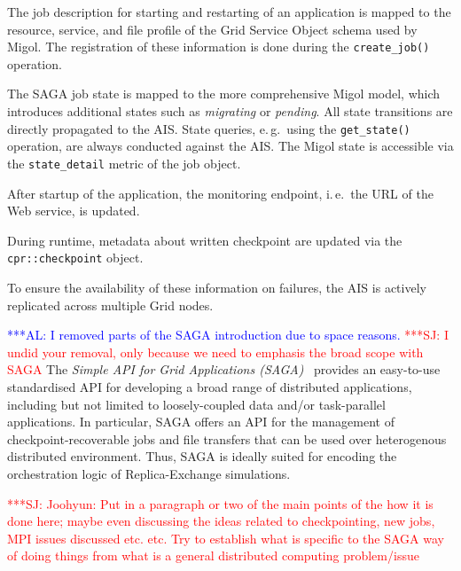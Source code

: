 \documentclass[conference,final]{IEEEtran}
\newcommand{\up}{\vspace*{-1em}}
\newcommand{\alnote}[1]{ {\textcolor{blue} { ***AL: #1 }}}
\newcommand{\jhanote}[1]{ {\textcolor{red} { ***SJ: #1 }}}
\newcommand{\alnote}[1]{}
\newcommand{\jhanote}[1]{}
\begin{document}
\begin{compactitem}
\item The job description for starting and restarting of an
  application is mapped to the resource, service, and file profile of
  the Grid Service Object schema used by Migol. The registration of
  these information is done during the \texttt{create\_job()}
  operation.
\item The SAGA job state is mapped to the more comprehensive Migol
  model, which introduces additional states such as \emph{migrating}
  or \emph{pending}. All state transitions are directly propagated to
  the AIS. State queries, e.\,g.\ using the \texttt{get\_state()}
  operation, are always conducted against the AIS. The Migol state is
  accessible via the \texttt{state\_detail} metric of the job object.
\item After startup of the application, the monitoring endpoint,
  i.\,e.\ the URL of the Web service, is updated.
\item During runtime, metadata about written checkpoint are 
  updated via the \texttt{cpr::checkpoint} object.
\end{compactitem}   
To ensure the availability of these information on failures,
the AIS is actively replicated across multiple Grid nodes.


\up
{}

\up \alnote{I removed parts of the SAGA introduction due to space
  reasons.}  \jhanote{I undid your removal, only because we need to
  emphasis the broad scope with SAGA} The \emph{Simple API for Grid
  Applications (SAGA)}~\cite{saga_gfd90} provides an easy-to-use
standardised API for developing a broad range of distributed
applications, including but not limited to loosely-coupled data and/or
task-parallel applications.  %
In particular, SAGA offers an API for the management of
checkpoint-recoverable jobs and file transfers that can be used over
heterogenous distributed environment. Thus, SAGA is ideally suited for
encoding the orchestration logic of Replica-Exchange simulations.

\jhanote{Joohyun: Put in a paragraph or two of the main points of the
  how it is done here; maybe even discussing the ideas related to
  checkpointing, new jobs, MPI issues discussed etc. etc. Try to
  establish what is specific to the SAGA way of doing things from what
  is a general distributed computing problem/issue}
\end{document}
